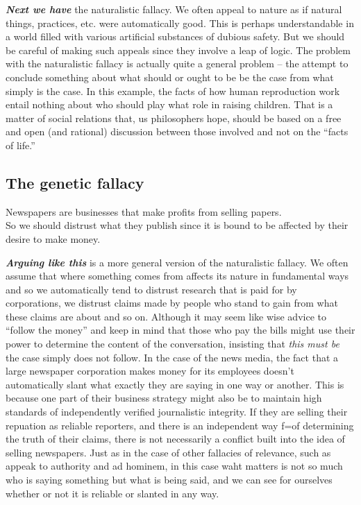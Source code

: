 \documentclass[12pt, openany]{book}
\begin{document}
\textbf{\emph{Next we have}} the naturalistic fallacy. We often appeal to nature as if natural things, practices, etc. were automatically good. This is perhaps understandable in a world filled with various artificial substances of dubious safety. But we should be careful of making such appeals since they involve a leap of logic. The problem with the naturalistic fallacy is actually quite a general problem -- the attempt to conclude something about what should or ought to be be the case from what simply is the case. In this example, the facts of how human reproduction work entail nothing about who should play what role in raising children. That is a matter of social relations that, us philosophers hope, should be based on a free and open (and rational) discussion between those involved and not on the ``facts of life.''

\hypertarget{the-genetic-fallacy}{%
\subsection*{The genetic fallacy}\label{the-genetic-fallacy}}


\begin{center}

\begin{argument}

Newspapers are businesses that make profits from selling papers.\\

So we should distrust what they publish since it is bound to be affected by their desire to make money.

\end{argument}

\end{center}

\textbf{\emph{Arguing like this}} is a more general version of the naturalistic fallacy. We often assume that where something comes from affects its nature in fundamental ways and so we automatically tend to distrust research that is paid for by corporations, we distrust claims made by people who stand to gain from what these claims are about and so on. Although it may seem like wise advice to ``follow the money'' and keep in mind that those who pay the bills might use their power to determine the content of the conversation, insisting that \emph{this must be} the case simply does not follow. In the case of the news media, the fact that a large newspaper corporation makes money for its employees doesn't automatically slant what exactly they are saying in one way or another. This is because one part of their business strategy might also be to maintain high standards of independently verified journalistic integrity. If they are selling their repuation as reliable reporters, and there is an independent way f=of determining the truth of their claims, there is not necessarily a conflict built into the idea of selling newspapers. Just as in the case of other fallacies of relevance, such as appeak to authority and ad hominem, in this case waht matters is not so much who is saying something but what is being said, and we can see for ourselves whether or not it is reliable or slanted in any way.
\end{document}
